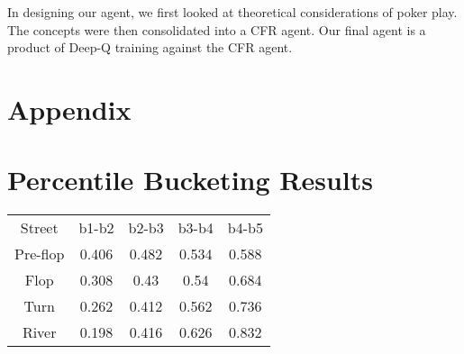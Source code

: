 \documentclass{article}
\begin{document}
In designing our agent, we first looked at theoretical considerations of poker play. The concepts were then consolidated into a CFR agent. Our final agent is a product of Deep-Q training against the CFR agent.




\appendix
\section{Appendix}

\section{Percentile Bucketing Results}
\begin{center}
\begin{tabular}{ c c c c c }
Street & b1-b2 & b2-b3 & b3-b4 & b4-b5\\
Pre-flop & 0.406 & 0.482 & 0.534 & 0.588\\ 
Flop & 0.308 & 0.43 & 0.54 & 0.684\\
Turn & 0.262 & 0.412 & 0.562 & 0.736\\
River & 0.198 & 0.416 & 0.626 & 0.832
\end{tabular}
\end{center}
\end{document}
